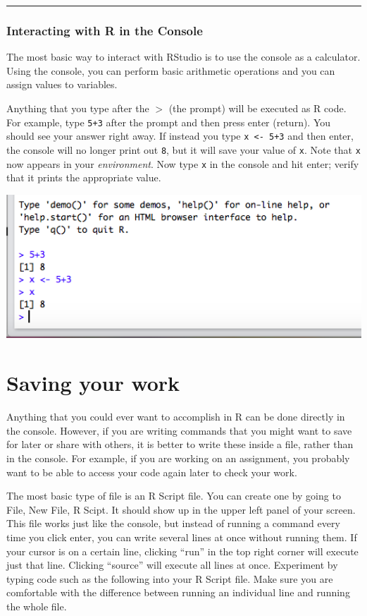 \documentclass[
]{article}
\begin{document}
\begin{center}\rule{0.5\linewidth}{0.5pt}\end{center}

\subsubsection{Interacting with R in the
Console}\label{interacting-with-r-in-the-console}

The most basic way to interact with RStudio is to use the console as a
calculator. Using the console, you can perform basic arithmetic
operations and you can assign values to variables.

Anything that you type after the \(>\) (the prompt) will be executed as
R code. For example, type \texttt{5+3} after the prompt and then press
enter (return). You should see your answer right away. If instead you
type \texttt{x\ \textless{}-\ 5+3} and then enter, the console will no
longer print out \texttt{8}, but it will save your value of \texttt{x}.
Note that \texttt{x} now appears in your \emph{environment}. Now type
\texttt{x} in the console and hit enter; verify that it prints the
appropriate value.

\includegraphics[width=7.29167in,height=\textheight,keepaspectratio]{more/rascalc.png}

\section{Saving your work}\label{saving-your-work}

Anything that you could ever want to accomplish in R can be done
directly in the console. However, if you are writing commands that you
might want to save for later or share with others, it is better to write
these inside a file, rather than in the console. For example, if you are
working on an assignment, you probably want to be able to access your
code again later to check your work.

The most basic type of file is an R Script file. You can create one by
going to File, New File, R Scipt. It should show up in the upper left
panel of your screen. This file works just like the console, but instead
of running a command every time you click enter, you can write several
lines at once without running them. If your cursor is on a certain line,
clicking ``run'' in the top right corner will execute just that line.
Clicking ``source'' will execute all lines at once. Experiment by typing
code such as the following into your R Script file. Make sure you are
comfortable with the difference between running an individual line and
running the whole file.
\end{document}

